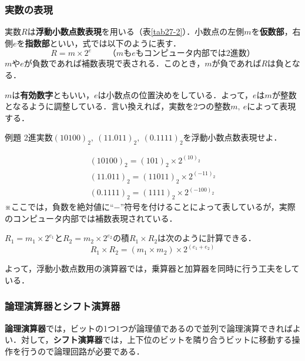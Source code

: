 \subsubsection{実数の表現}\label{sec27-2-C-7}

実数$R$は\textbf{浮動小数点数表現}を用いる（表\ref{tab27-2}）．小数点の左側$m$を\textbf{仮数部}，右側$e$を\textbf{指数部}といい，式では以下のように表す．
\begin{equation}
	R = m \times 2^e \qquad \text{（$m$も$e$もコンピュータ内部では2進数）}
\end{equation}
$m$や$e$が負数であれば補数表現で表される．このとき，$m$が負であれば$R$は負となる．

$m$は\textbf{有効数字}ともいい，$e$は小数点の位置決めをしている．よって，$e$は$m$が整数となるように調整している．言い換えれば，実数を2つの整数$m,\ e$によって表現する．

\begin{tip}{例題}
	\textsf{
		2進実数$(10100)_{2},\ (11.011)_{2},\ (0.1111)_{2}$を浮動小数点数表現せよ．
	}
	
	\tcblower

	\begin{gather*}
		(10100)_{2} = (101)_{2} \times 2^{(10)_{2}}\\
		(11.011)_{2} = (11011)_{2} \times 2^{(-11)_{2}}\\
		(0.1111)_{2} = (1111)_{2} \times 2^{(-100)_{2}}
	\end{gather*}
	※ここでは，負数を絶対値に“$-$”符号を付けることによって表しているが，実際のコンピュータ内部では補数表現されている．
\end{tip}

$R_1 = m_1 \times 2^{e_1}$と$R_2 = m_2 \times 2^{e_2}$の積$R_1 \times R_2$は次のように計算できる．
\begin{equation}
	R_1 \times R_2 = (m_1 \times m_2) \times 2^{(e_1 + e_2)}
\end{equation}

よって，浮動小数点数用の演算器では，乗算器と加算器を同時に行う工夫をしている．



\subsubsection{論理演算器とシフト演算器}\label{sec27-2-C-8}

\textbf{論理演算器}では，ビットの1つ1つが論理値であるので並列で論理演算できればよい．対して，\textbf{シフト演算器}では，上下位のビットを隣り合うビットに移動する操作を行うので論理回路が必要である．



